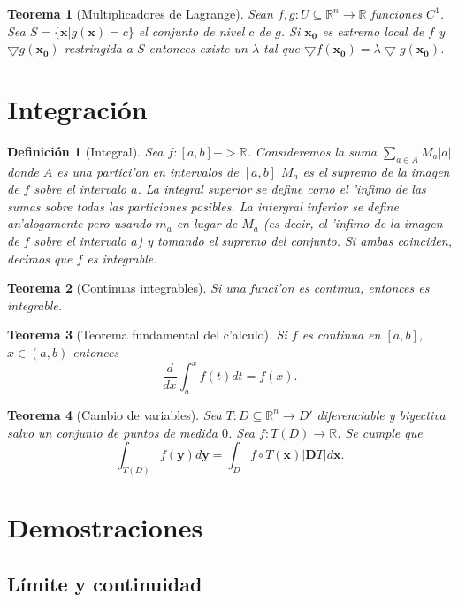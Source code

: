 \documentclass[a4paper,spanish]{article}
\newcommand{\R}[0]{\mathbb{R}}
\newcommand{\xx}[0]{\mathbf{x}}
\newcommand{\xO}[0]{\mathbf{x_0}}
\newcommand{\comp}[0]{\circ}
\newcommand{\D}[0]{\mathbf{D}}
\newcommand{\grad}[0]{\bigtriangledown}
\newtheorem{teo}{Teorema}
\newtheorem{defi}{Definici\'on}
\begin{document}
\begin{teo}[Multiplicadores de Lagrange]
\label{teo-mult-lagrange}
Sean $f,g: U \subseteq \R^n \to \R$ funciones $C^1$. Sea 
$S = \{\xx | g(\xx) = c\}$ el conjunto de nivel $c$ de $g$. Si $\xO$ es
extremo local de $f$ y $\grad g(\xO)$ restringida a $S$ entonces existe un
$\lambda$ tal que $\grad f(\xO) = \lambda \grad g(\xO)$.
\end{teo}

\section{Integraci\'on}

\begin{defi}[Integral]
\label{defi-integral}
Sea $f : [a,b] -> \R$. Consideremos la suma $\sum_{a \in A} M_a |a|$ donde 
$A$ es una partici'on en intervalos de $[a,b]$ $M_a$ es el supremo de la 
imagen de $f$ sobre el intervalo $a$. La \emph{integral superior} se define
como el 'infimo de las sumas sobre todas las particiones posibles.
La \emph{intergral inferior} se define an'alogamente pero usando $m_a$ en 
lugar de $M_a$ (es decir, el 'infimo de la imagen de $f$ sobre el intervalo 
$a$) y tomando el supremo del conjunto. Si ambas coinciden, decimos que $f$ es
integrable.
\end{defi}

\begin{teo}[Continuas integrables]
Si una funci'on es continua, entonces es integrable.
\end{teo}

\begin{teo}[Teorema fundamental del c'alculo]
Si $f$ es continua en $[a,b]$, $x \in (a,b)$ entonces
$$\frac{d}{dx} \int_a^x f(t) dt = f(x).$$
\end{teo}

\begin{teo}[Cambio de variables]
Sea $T : D \subseteq \R^n \to D'$ diferenciable y biyectiva salvo un conjunto
de puntos de medida $0$. Sea $f : T(D) \to \R$. Se cumple que
$$\int_{T(D)} f(\mathbf{y}) d\mathbf{y} = \int_{D} f \comp T(\xx) |\D T| d\xx.$$
\end{teo}

\section{Demostraciones}

\subsection{L\'imite y continuidad}
\end{document}
